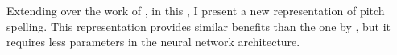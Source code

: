 

Extending over the work of \textcite{micchi2020not}, in this \thesisdiss{}, I present a new representation of pitch spelling. This representation provides similar benefits than the one by \textcite{micchi2020not}, but it requires less parameters in the neural network architecture.
